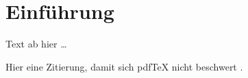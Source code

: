 \section{Einführung}

Text ab hier \ldots

Hier eine Zitierung, damit sich pdfTeX nicht beschwert \cite{Papula2006}.
